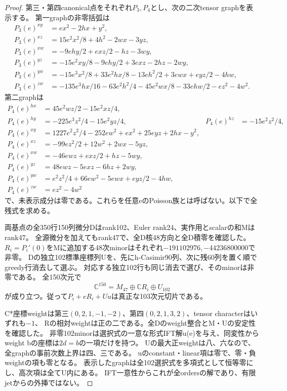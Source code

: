\documentclass[a4paper,11pt]{ltjsarticle}
\theoremstyle{definition}
\begin{document}
\begin{proof}
第三・第四canonical点をそれぞれ$P_3,P_4$とし、次の二次tensor graphを表示する。
第一graphの非零括弧は
\[
\begin{aligned}
 P_3(e)^{xy}&=ex^2-2hx+y^2,\\
 P_3(e)^{xz}&=15e^2x^2/8+4h^2-2wx-3yz,\\
 P_3(e)^{xw}&=-9ehy/2+exz/2-hz-3wy,\\
 P_3(e)^{yz}&=-15e^2xy/8-9ehy/2+3exz-2hz-2wy,\\
 P_3(e)^{yw}&=-15e^3x^2/8+33e^2hx/8-13eh^2/2+3ewx+eyz/2-4hw,\\
 P_3(e)^{zw}&=-135e^3hx/16-63e^2h^2/4-45e^2wx/8-33ehw/2-ez^2-4w^2.
\end{aligned}
\]
第二graphは
\[
\begin{aligned}
 P_4(e)^{hx}&=45e^2wz/2-15e^2xz/4,\\
 P_4(e)^{hy}&=-225e^3z^2/4-15e^2yz/4,&P_4(e)^{hz}&=-15e^2z^2/4,\\
 P_4(e)^{xy}&=1227e^2z^2/4-252ew^2+ex^2+25eyz+2hx-y^2,\\
 P_4(e)^{xz}&=-99ez^2/2+12w^2+2wx-5yz,\\
 P_4(e)^{xw}&=-46ewz+exz/2+hz-5wy,\\
 P_4(e)^{yz}&=48ewz-5exz-6hz+2wy,\\
 P_4(e)^{yw}&=e^2z^2/4+66ew^2-5ewx+eyz/2-4hw,\\
 P_4(e)^{zw}&=ez^2-4w^2
\end{aligned}
\]
で、未表示成分は零である。これらを任意eのPoisson族とは呼ばない。以下で全残式を求める。

両基点の全350行150列微分Dはrank102、Euler rank24、実作用とscalarの和Mはrank47。
全源微分を加えてもrank47で、全D核48方向と全D積零を確認した。
$R_i=P_i'(0)$をMに追加する48次minorはそれぞれ$-191102976,-44236800000$で非零。
Dの独立102標準座標列Uを、先にh-Casimir90列、次に残60列を置く順でgreedy行消去して選ぶ。
対応する独立102行も同じ消去で選び、そのminorは非零である。
全150次元で
\[
 \mathbb C^{150}=M_{47}\oplus\mathbb C R_i\oplus U_{102}
\]
が成り立つ。従って$P_i+eR_i+Uu$は真正な103次元切片である。

C*座標weightは第三$(0,2,1,-1,-2)$、第四$(0,2,1,3,2)$、tensor characterはいずれも$-1$、
Rの相対weightは正の二である。全Dのweight整合とM・Uの安定性を確認した。
非零102minorは選択式の一意な形式IFT解u(e)を与え、同変性からweight bの座標は$2d=b$の一項だけを持つ。
Uの最大正weightは八、六なので、全graphの事前次数上界は四、三である。
uのconstant・linear項は零で、零・負weightの項も零となる。
表示したgraphは全102選択式を多項式として恒等零にし、高次項は全てU内にある。
IFT一意性からこれが全ordersの解であり、有限jetからの外挿ではない。


\end{proof}
\end{document}
